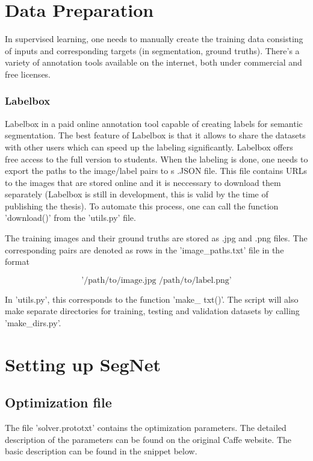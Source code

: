 \section{Data Preparation}

In supervised learning, one needs to manually create the training data consisting of inputs and corresponding targets (in segmentation, ground truths). There's a variety of annotation tools available on the internet, both under commercial and free licenses. 

\subsubsection{Labelbox}

Labelbox in a paid online annotation tool capable of creating labels for semantic segmentation. The best feature of Labelbox is that it allows to share the datasets with other users which can speed up the labeling significantly. Labelbox offers free access to the full version to students. When the labeling is done, one needs to export the paths to the image/label pairs to s .JSON file. This file contains URLs to the images that are stored online and it is neccessary to download them separately (Labelbox is still in development, this is valid by the time of publishing the thesis). To automate this process, one can call the function 'download()' from the 'utils.py' file. 

The training images and their ground truths are stored as .jpg and .png files. The corresponding pairs are denoted as rows in the 'image\_paths.txt' file in the format 

$$
\text{'/path/to/image.jpg /path/to/label.png'}
$$

In 'utils.py', this corresponds to the function 'make\_ txt()'. The script will also make separate directories for training, testing and validation datasets by calling 'make\_dirs.py'.

\section{Setting up SegNet}

\subsection{Optimization file}

The file 'solver.prototxt' contains the optimization parameters. The detailed description of the parameters can be found on the original Caffe website. The basic description can be found in the snippet below. 

